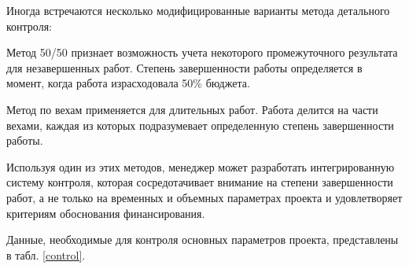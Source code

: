Иногда встречаются несколько модифицированные варианты метода детального контроля:

Метод 50/50 признает возможность учета некоторого промежуточного результата для незавершенных работ. Степень завершенности работы определяется в момент, когда работа израсходовала 50\% бюджета.

Метод по вехам применяется для длительных работ. Работа делится на части вехами, каждая из которых подразумевает определенную степень завершенности работы.

Используя один из этих методов, менеджер может разработать интегрированную систему контроля, которая сосредотачивает внимание на степени завершенности работ, а не только на временных и объемных параметрах проекта и удовлетворяет критериям обоснования финансирования.

Данные, необходимые для контроля основных параметров проекта, представлены в табл. \ref{control}.
